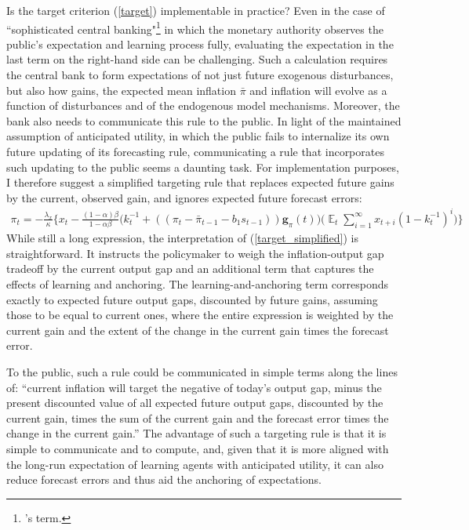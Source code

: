 \documentclass[11pt]{article}
\renewcommand{\[}{\begin{equation}}
\renewcommand{\]}{\end{equation}}
\DeclareMathOperator{\E}{\mathbb{E}}
\begin{document}
Is the target criterion (\ref{target}) implementable in practice? Even in the case of ``sophisticated central banking"\footnote{\cite{gaspar2006adaptive}'s term.} in which the monetary authority observes the public's expectation and learning process fully, evaluating the expectation in the last term on the right-hand side can be challenging. Such a calculation requires the central bank to form expectations of not just future exogenous disturbances, but also how gains, the expected mean inflation $\bar{\pi}$ and inflation will evolve as a function of disturbances and of the endogenous model mechanisms. Moreover, the bank also needs to communicate this rule to the public. In light of the maintained assumption of anticipated utility, in which the public fails to internalize its own future updating of its forecasting rule, communicating a rule that incorporates such updating to the public seems a daunting task. For implementation purposes, I therefore suggest a simplified targeting rule that replaces expected future gains by the current, observed gain, and ignores expected future forecast errors:
\begin{align}
\pi_t  = -\frac{\lambda_x}{\kappa}\bigg\{x_t - \frac{(1-\alpha)\beta}{1-\alpha\beta} \bigg(k_t^{-1}+((\pi_t - \bar{\pi}_{t-1}-b_1 s_{t-1}))\mathbf{g}_{\pi}(t) \bigg) 
\bigg(\E_t\sum_{i=1}^{\infty}x_{t+i}(1-k_{t}^{-1})^{i} \bigg)
\bigg\} \label{target_simplified}
\end{align} 
While still a long expression, the interpretation of (\ref{target_simplified}) is straightforward. It instructs the policymaker to weigh the inflation-output gap tradeoff by the current output gap and an additional term that captures the effects of learning and anchoring. The learning-and-anchoring term corresponds exactly to expected future output gaps, discounted by future gains, assuming those to be equal to current ones, where the entire expression is weighted by the current gain and the extent of the change in the current gain times the forecast error.

To the public, such a rule could be communicated in simple terms along the lines of: ``current inflation will target the negative of today's output gap, minus the present discounted value of all expected future output gaps, discounted by the current gain, times the sum of the current gain and the forecast error times the change in the current gain.'' The advantage of such a targeting rule is that it is simple to communicate and to compute, and, given that it is more aligned with the long-run expectation of learning agents with anticipated utility, it can also reduce forecast errors and thus aid the anchoring of expectations. 
\end{document}
